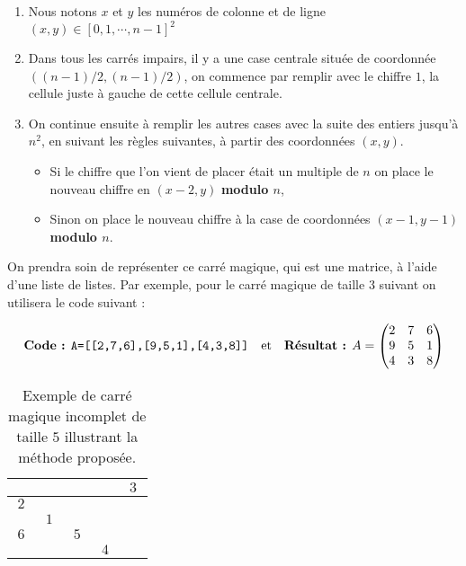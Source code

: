 \begin{enumerate}
	\item Nous notons $x$ et $y$ les numéros de colonne et de ligne $(x,y) \in \left[0,1,\cdots,n-1\right]^2$
	\item Dans tous les carrés impairs, il y a une case centrale située de coordonnée $((n-1)/2,(n-1)/2)$, on commence par remplir avec le chiffre $1$, la cellule juste à gauche de cette cellule centrale.
\item On continue ensuite à remplir les autres cases avec la suite des entiers jusqu'à $n^2$, en suivant les règles suivantes, à partir des coordonnées $(x,y)$.
\begin{itemize}
	\item Si le chiffre que l'on vient de placer était un multiple de $n$ on place le nouveau chiffre en  $(x-2,y)$ \textbf{modulo $n$},
	\item Sinon on place le nouveau chiffre à la case de coordonnées $(x-1,y-1)$ \textbf{modulo $n$}.
\end{itemize}
\end{enumerate}

On prendra soin de représenter ce carré magique, qui est une matrice, à l'aide d'une liste de listes. Par exemple, pour le carré magique de taille 3 suivant on utilisera le code suivant :

	\[\begin{array}{ccc}
	\mbox{\textbf{Code :} \texttt{A=[[2,7,6],[9,5,1],[4,3,8]]}} & \mbox{et} &\mbox{\textbf{Résultat :} } A=\begin{pmatrix}
			2 & 7 & 6 \\ 
			9 & 5 & 1 \\ 
			4 & 3 & 8 
	\end{pmatrix}
	\end{array}
\]

\begin{table}[h]
\renewcommand{\arraystretch}{1.2}
	\centering
		\begin{tabular}{|*{5}{c|}}
			\hline
			 & & & &$~3~$\\
			\hline
			$~2~$& & & & \\
			\hline
			   &$~1~$&   &   &   \\
			\hline
			$~6~$& &$~5~$& & \\
			\hline
			 & & &$~4~$& \\
			\hline
		\end{tabular}
\renewcommand{\arraystretch}{1}
\caption{Exemple de carré magique incomplet de taille $5$ illustrant la méthode proposée.}
\label{Carre5}
\end{table}

